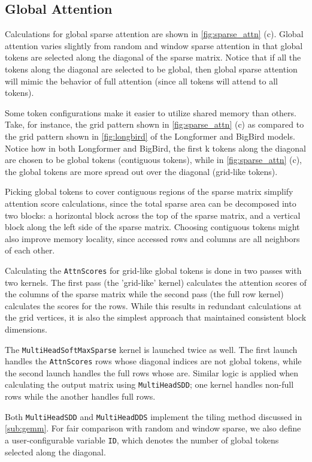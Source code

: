 \documentclass[11pt]{article}
\begin{document}
\subsection{Global Attention}
Calculations for global sparse attention are shown in \autoref{fig:sparse_attn} (c). Global attention varies slightly from random and window sparse attention in that global tokens are selected along the diagonal of the sparse matrix. Notice that if all the tokens along the diagonal are selected to be global, then global sparse attention will mimic the behavior of full attention (since all tokens will attend to all tokens). 

Some token configurations make it easier to utilize shared memory than others. Take, for instance, the grid pattern shown in \autoref{fig:sparse_attn} (c) as compared to the grid pattern shown in \autoref{fig:longbird} of the Longformer and BigBird models. Notice how in both Longformer and BigBird, the first k tokens along the diagonal are chosen to be global tokens (contiguous tokens), while in \autoref{fig:sparse_attn} (c), the global tokens are more spread out over the diagonal (grid-like tokens). 

Picking global tokens to cover contiguous regions of the sparse matrix simplify attention score calculations, since the total sparse area can be decomposed into two blocks: a horizontal block across the top of the sparse matrix, and a vertical block along the left side of the sparse matrix. Choosing contiguous tokens might also improve memory locality, since accessed rows and columns are all neighbors of each other.

Calculating the \texttt{AttnScores} for grid-like global tokens is done in two passes with two kernels. The first pass (the 'grid-like' kernel) calculates the attention scores of the columns of the sparse matrix while the second pass (the full row kernel) calculates the scores for the rows. While this results in redundant calculations at the grid vertices, it is also the simplest approach that maintained consistent block dimensions.

The \texttt{MultiHeadSoftMaxSparse} kernel is launched twice as well. The first launch handles the \texttt{AttnScores} rows whose diagonal indices are not global tokens, while the second launch handles the full rows whose are. Similar logic is applied when calculating the output matrix using \texttt{MultiHeadSDD}; one kernel handles non-full rows while the another handles full rows.

Both \texttt{MultiHeadSDD} and \texttt{MultiHeadDDS} implement the tiling method discussed in \autoref{sub:gemm}. For fair comparison with random and window sparse, we also define a user-configurable variable \texttt{ID}, which denotes the number of global tokens selected along the diagonal.
\end{document}
